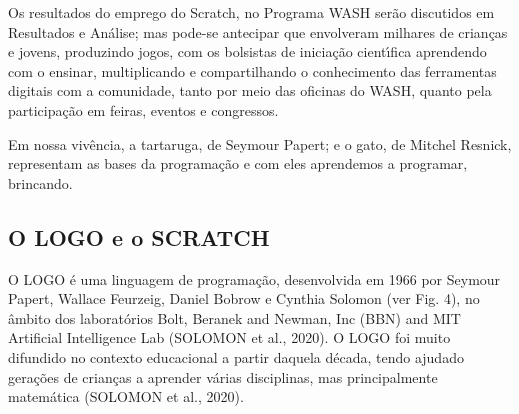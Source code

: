 \documentclass[
12pt,		%
openright,	%
twoside,  %
a4paper,			%
chapter=TITLE,		%
english,			%
french,				%
spanish,			%
brazil				%
]{USPSC-classe/USPSC}
\begin{document}
Os resultados do emprego do Scratch, no Programa WASH ser\~ao discutidos em Resultados e An\'alise; mas pode-se antecipar que envolveram milhares de crian\c{c}as e jovens, produzindo jogos, com os bolsistas de inicia\c{c}\~ao cient\'{\i}fica aprendendo com o ensinar, multiplicando e compartilhando o conhecimento das ferramentas digitais  com a comunidade, tanto por meio das oficinas do WASH, quanto pela participa\c{c}\~ao em feiras, eventos e congressos.

















Em nossa viv\^encia, a tartaruga, de Seymour Papert; e o gato, de Mitchel Resnick,  representam as bases da  programa\c{c}\~ao e com eles aprendemos a  programar, brincando.

















\subsection[O LOGO e o SCRATCH]{O LOGO e o SCRATCH}\label{O LOGO e o SCRATCH}
O LOGO \'e uma linguagem de programa\c{c}\~ao, desenvolvida em 1966 por Seymour Papert, Wallace Feurzeig, Daniel Bobrow e Cynthia Solomon (ver Fig. 4), no \^ambito dos laborat\'orios Bolt, Beranek and Newman, Inc (BBN) and MIT Artificial Intelligence Lab (SOLOMON et al., 2020). O LOGO foi muito difundido no contexto educacional a partir daquela d\'ecada, tendo ajudado gera\c{c}\~oes de crian\c{c}as a aprender v\'arias disciplinas, mas principalmente matem\'atica  (SOLOMON et al., 2020).
\end{document}
